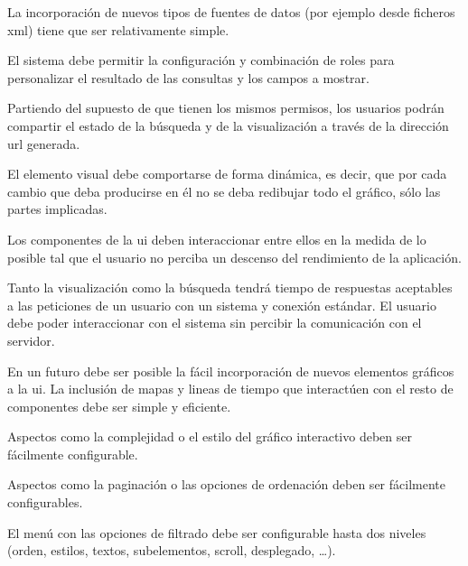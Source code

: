 La incorporación de nuevos tipos de fuentes de datos (por ejemplo desde ficheros \gls{xml}) tiene que ser relativamente simple.

El sistema debe permitir la configuración y combinación de roles para personalizar el resultado de las consultas y los campos a mostrar.

Partiendo del supuesto de que tienen los mismos permisos, los usuarios podrán compartir el estado de la búsqueda y de la visualización a través de la dirección \gls{url} generada.

El elemento visual debe comportarse de forma dinámica, es decir, que por cada cambio que deba producirse en él no se deba redibujar todo el gráfico, sólo las partes implicadas.

Los componentes de la \gls{ui} deben interaccionar entre ellos en la medida de lo posible tal que el usuario no perciba un descenso del rendimiento de la aplicación.

Tanto la visualización como la búsqueda tendrá tiempo de respuestas aceptables a las peticiones de un usuario con un sistema y conexión estándar. El usuario debe poder interaccionar con el sistema sin percibir la comunicación con el servidor.

En un futuro debe ser posible la fácil incorporación de nuevos elementos gráficos a la \gls{ui}. La inclusión de mapas y lineas de tiempo que interactúen con el resto de componentes debe ser simple y eficiente.

Aspectos como la complejidad o el estilo del gráfico interactivo deben ser fácilmente configurable.

Aspectos como la paginación o las opciones de ordenación deben 
ser fácilmente configurables.

El menú con las opciones de filtrado debe ser configurable hasta dos niveles (orden, estilos, textos, subelementos, \gls{scroll}, desplegado, \dots).

